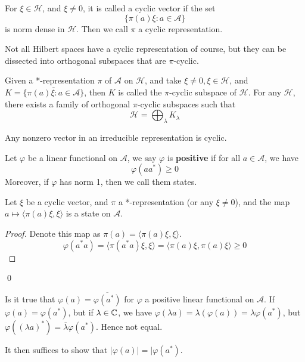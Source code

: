 \begin{definition}
    For $\xi\in\mathcal{H}$, and $\xi\neq 0$, it is called a cyclic vector if the set
    \begin{equation*}
        \{\pi(a)\xi: a\in\mathcal{A}\}
    \end{equation*}
    is norm dense in $\mathcal{H}$. Then we call $\pi$ a cyclic representation.
\end{definition}
Not all Hilbert spaces have a cyclic representation of course, but they can be dissected into orthogonal subspaces that are $\pi$-cyclic.
\begin{proposition}
    Given a *-representation $\pi$ of $\mathcal{A}$ on $\mathcal{H}$, and take $\xi\neq 0, \xi\in\mathcal{H}$, and $K=\overline{\{\pi(a)\xi: a\in\mathcal{A}\}}$, then $K$ is called the $\pi$-cyclic subspace of $\mathcal{H}$. For any $\mathcal{H}$, there exists a family of orthogonal $\pi$-cyclic subspaces such that 
    \begin{equation*}
        \mathcal{H}=\bigoplus_\lambda K_\lambda
    \end{equation*} 
\end{proposition}
\begin{remark}
    Any nonzero vector in an irreducible representation is cyclic.
\end{remark}

\begin{definition}[state]
    Let $\varphi$ be a linear functional on $\mathcal{A}$, we say $\varphi$ is \textbf{positive} if for all $a\in\mathcal{A}$, we have
    \begin{equation*}
        \varphi(aa^*)\geq 0
    \end{equation*}
    Moreover, if $\varphi$ has norm 1, then we call them states.
\end{definition}

\begin{proposition}
    Let $\xi$ be a cyclic vector, and $\pi$ a *-representation (or any $\xi\neq 0$), and the map $a\mapsto \langle \pi(a)\xi, \xi\rangle $ is a state on $\mathcal{A}$.
\end{proposition}
\begin{proof}
    Denote this map as $\pi(a)=\langle \pi(a)\xi, \xi\rangle$.
    \begin{equation*}
        \varphi(a^*a)=\langle \pi(a^*a)\xi, \xi\rangle =\langle \pi(a)\xi, \pi(a)\xi\rangle \geq 0
    \end{equation*}
\end{proof}
\qed


Is it true that $\varphi(a)=\overline{\varphi(a^*)}$ for $\varphi$ a positive linear functional on $\mathcal{A}$.
If $\varphi(a)=\varphi(a^*)$, but if $\lambda\in\mathbb{C}$, we have $\varphi(\lambda a)=\lambda (\varphi(a))=\lambda\varphi(a^*)$, but $\varphi((\lambda a)^*)=\overline{\lambda}\varphi(a^*)$. Hence not equal.

It then suffices to show that $|\varphi(a)|=|\varphi(a^*)$.